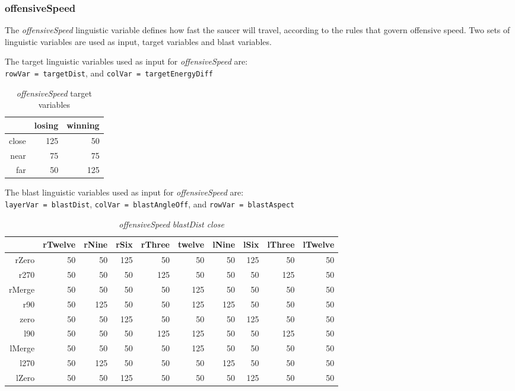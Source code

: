 \subsubsection{offensiveSpeed}

The \emph{offensiveSpeed} linguistic variable defines how fast the saucer will travel, according to the rules that govern offensive speed. Two sets of linguistic variables are used as input, target variables and blast variables.

The target linguistic variables used as input for \emph{offensiveSpeed} are: \\ \texttt{rowVar = targetDist}, and \texttt{colVar = targetEnergyDiff}

\begin{table}[H]
\centering
\caption{\emph{offensiveSpeed} target variables}
\begin{tabular}{r|r|r}
 		& losing 	& winning	\\ \hline
close	& 125		& 50		\\
near	& 75		& 75		\\
far		& 50		& 125			
\end{tabular}
\end{table}

The blast linguistic variables used as input for \emph{offensiveSpeed} are: \\ \texttt{layerVar = blastDist}, \texttt{colVar = blastAngleOff}, and \texttt{rowVar = blastAspect}

\begin{table}[H]
\centering
\caption{\emph{offensiveSpeed} \emph{blastDist close}}
\begin{tabular}{r|r|r|r|r|r|r|r|r|r}
 		& rTwelve 	& rNine 	& rSix 		& rThree 		& twelve 	& lNine 	& lSix 		& lThree	& lTwelve		\\ \hline
rZero	& 50		& 50		& 125		& 50 		 	& 50		& 50		& 125 		& 50		& 50			\\
r270	& 50		& 50		& 50		& 125			& 50		& 50		& 50		& 125		& 50			\\
rMerge	& 50		& 50		& 50	 	& 50			& 125		& 50		& 50		& 50		& 50			\\
r90		& 50		& 125		& 50 		& 50			& 125		& 125		& 50		& 50		& 50			\\
zero 	& 50		& 50 		& 125 		& 50			& 50		& 50		& 125		& 50		& 50			\\
l90 	& 50		& 50 		& 50		& 125			& 125		& 50		& 50		& 125		& 50			\\
lMerge	& 50		& 50 		& 50	 	& 50			& 125		& 50		& 50		& 50		& 50			\\
l270 	& 50		& 125	 	& 50 		& 50			& 50		& 125		& 50		& 50		& 50			\\
lZero 	& 50		& 50 		& 125	 	& 50			& 50		& 50  		& 125		& 50		& 50			
\end{tabular}
\end{table}

